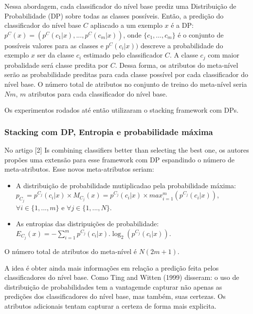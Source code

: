 \documentclass[]{book}
\begin{document}
Nessa abordagem, cada classificador do nível base prediz uma
Distribuição de Probabilidade (DP) sobre todas as classes possíveis.
Então, a predição do classificador do nível base \(C\) apliacado a um
exemplo \(x\) é a DP: \(p^C(x) = (p^C(c_1|x), ... , p^C(c_m|x))\), onde
\(\{c_1, ..., c_m\}\) é o conjunto de possíveis valores para as classes
e \(p^C(c_i|x))\) descreve a probabilidade do exemplo \(x\) ser da
classe \(c_i\) estimado pelo classificador \(C\). A classe \(c_j\) com
maior probalidade será classe predita por \(C\). Dessa forma, os
atributos do meta-nível serão as probabilidade preditas para cada classe
possível por cada classificador do nível base. O número total de
atributos no conjunto de treino do meta-nível seria \(Nm\), \(m\)
atributos para cada classificador do nível base.

Os experimentos rodados até então utilizaram o stacking framework com
DPs.

\subsubsection{Stacking com DP, Entropia e probabilidade
máxima}\label{stacking-com-dp-entropia-e-probabilidade-maxima}

No artigo {[}2{]} Is combining classifiers better than selecting the
best one, os autores propões uma extensão para esse framework com DP
espandindo o número de meta-atributos. Esse novos meta-atributos seriam:

\begin{itemize}
\item
  A distribuição de probabilidade mutiplicadao pela probabilidade
  máxima:
  \(p_{C_j} = p^{C_j}(c_i|x) \times M_{C_j}(x) = p^{C_j}(c_i|x) \times max_{i=1}^{m}(p^{C_j}(c_i|x))\),
  \(\forall i \in \{1,...,m\}\) e \(\forall j \in \{1,...,N\}\).
\item
  As entropias das distripuições de probabilidade:
  \(E_{C_j}(x) = -\sum_{i=1}^{m}p^{C_j}(c_i|x).\log_2(p^{C_j}(c_i|x))\).
\end{itemize}

O número total de atributos do meta-nível é \(N(2m+1)\).

A idea é obter ainda mais informações em relação a predição feita pelos
classificadores do nível base. Como Ting and Witten (1999) disseram: o
uso de distribuição de probabilidades tem a vantagemde capturar não
apenas as predições dos classificadores do nível base, mas também, suas
certezas. Os atributos adicionais tentam capturar a certeza de forma
mais explicita.
\end{document}
